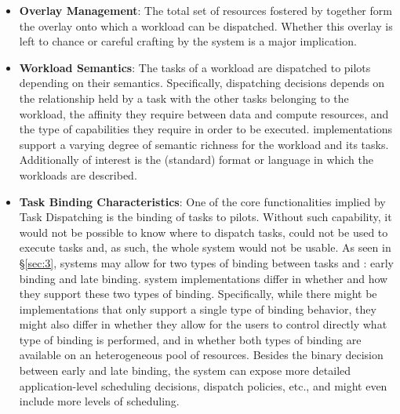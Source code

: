 \documentclass{sig-alternate}
\begin{document}
\begin{itemize}
\item \textbf{Overlay Management}: The total set of resources fostered by
  \pilots together form the overlay onto which a workload can be dispatched.
  Whether this overlay is left to chance or careful crafting by the \pilot
  system is a major implication.


\item \textbf{Workload Semantics}: The tasks of a workload are dispatched to
  pilots depending on their semantics. Specifically, dispatching decisions
  depends on the relationship held by a task with the other tasks belonging to
  the workload, the affinity they require between data and compute resources,
  and the type of capabilities they require in order to be executed. \pilot
  implementations support a varying degree of semantic richness for the
  workload and its tasks.  Additionally of interest is the (standard) format or
  language in which the workloads are described.

\item \textbf{Task Binding Characteristics}: One of the core functionalities
  implied by Task Dispatching is the binding of tasks to pilots. Without such
  capability, it would not be possible to know where to dispatch tasks, \pilots
  could not be used to execute tasks and, as such, the whole \pilot system
  would not be usable. As seen in \S\ref{sec:3}, \pilot systems may allow for
  two types of binding between tasks and \pilots: early binding and late
  binding. \pilot system implementations differ in whether and how they support
  these two types of binding. Specifically, while there might be
  implementations that only support a single type of binding behavior, they
  might also differ in whether they allow for the users to control directly
  what type of binding is performed, and in whether both types of binding are
  available on an heterogeneous pool of resources.
  Besides the binary decision between early and late binding, the \pilot system
  can expose more detailed application-level scheduling decisions, dispatch
  policies, etc., and might even include more levels of scheduling.


\end{itemize}
\end{document}
